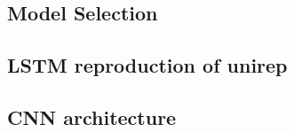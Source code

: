 \subsection{Model Selection}


\subsection{LSTM reproduction of unirep}
%

\subsection{CNN architecture}



